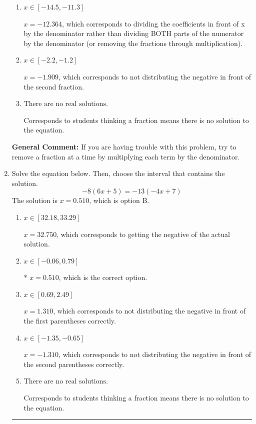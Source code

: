 \documentclass{extbook}[14pt]
\newcommand{\litem}[1]{\item #1

\rule{\textwidth}{0.4pt}}
\begin{document}
\begin{enumerate}
{\begin{enumerate}[label=\Alph*.]
 $x = 4.375$, which corresponds to dividing the second number in the numerator by the denominator rather than dividing BOTH parts of the numerator by the denominator (or removing the fractions through multiplication).
\item \( x \in [-14.5, -11.3] \)

 $x = -12.364$, which corresponds to dividing the coefficients in front of x by the denominator rather than dividing BOTH parts of the numerator by the denominator (or removing the fractions through multiplication).
\item \( x \in [-2.2, -1.2] \)

 $x = -1.909$, which corresponds to not distributing the negative in front of the second fraction.
\item \( \text{There are no real solutions.} \)

Corresponds to students thinking a fraction means there is no solution to the equation.
\end{enumerate}

\textbf{General Comment:} If you are having trouble with this problem, try to remove a fraction at a time by multiplying each term by the denominator.
}
\litem{
Solve the equation below. Then, choose the interval that contains the solution.
\[ -8(6x + 5) = -13(-4x + 7) \]The solution is \( x = 0.510 \), which is option B.\begin{enumerate}[label=\Alph*.]
\item \( x \in [32.18, 33.29] \)

$x = 32.750$, which corresponds to getting the negative of the actual solution.
\item \( x \in [-0.06, 0.79] \)

* $x = 0.510$, which is the correct option.
\item \( x \in [0.69, 2.49] \)

$x = 1.310$, which corresponds to not distributing the negative in front of the first parentheses correctly.
\item \( x \in [-1.35, -0.65] \)

$x = -1.310$, which corresponds to not distributing the negative in front of the second parentheses correctly.
\item \( \text{There are no real solutions.} \)

Corresponds to students thinking a fraction means there is no solution to the equation.
\end{enumerate}

}
\end{enumerate}
\end{document}
